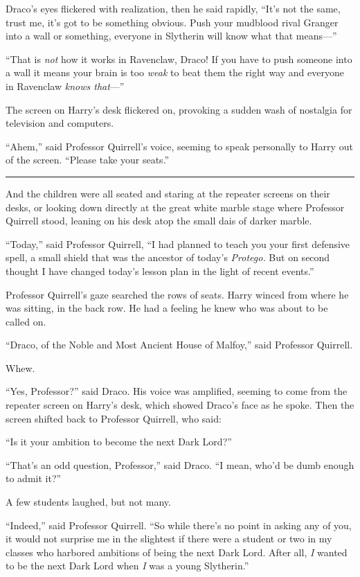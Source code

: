 Draco's eyes flickered with realization, then he said rapidly, ``It's
not the same, trust me, it's got to be something obvious. Push your
mudblood rival Granger into a wall or something, everyone in Slytherin
will know what that means---''

``That is \emph{not} how it works in Ravenclaw, Draco! If you have to
push someone into a wall it means your brain is too \emph{weak} to beat
them the right way and everyone in Ravenclaw \emph{knows that}---''

The screen on Harry's desk flickered on, provoking a sudden wash of
nostalgia for television and computers.

``Ahem,'' said Professor Quirrell's voice, seeming to speak personally
to Harry out of the screen. ``Please take your seats.''

\begin{center}\rule{3in}{0.4pt}\end{center}

And the children were all seated and staring at the repeater screens on
their desks, or looking down directly at the great white marble stage
where Professor Quirrell stood, leaning on his desk atop the small dais
of darker marble.

``Today,'' said Professor Quirrell, ``I had planned to teach you your
first defensive spell, a small shield that was the ancestor of today's
\emph{Protego.} But on second thought I have changed today's lesson plan
in the light of recent events.''

Professor Quirrell's gaze searched the rows of seats. Harry winced from
where he was sitting, in the back row. He had a feeling he knew who was
about to be called on.

``Draco, of the Noble and Most Ancient House of Malfoy,'' said Professor
Quirrell.

Whew.

``Yes, Professor?'' said Draco. His voice was amplified, seeming to come
from the repeater screen on Harry's desk, which showed Draco's face as
he spoke. Then the screen shifted back to Professor Quirrell, who said:

``Is it your ambition to become the next Dark Lord?''

``That's an odd question, Professor,'' said Draco. ``I mean, who'd be
dumb enough to admit it?''

A few students laughed, but not many.

``Indeed,'' said Professor Quirrell. ``So while there's no point in
asking any of you, it would not surprise me in the slightest if there
were a student or two in my classes who harbored ambitions of being the
next Dark Lord. After all, \emph{I} wanted to be the next Dark Lord when
\emph{I} was a young Slytherin.''

